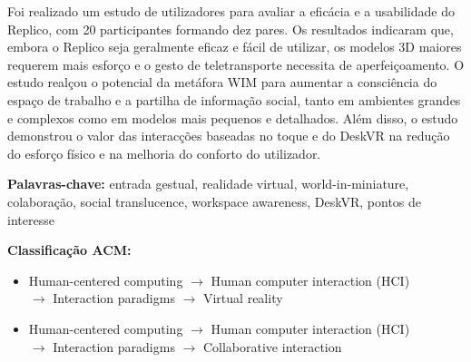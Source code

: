 Foi realizado um estudo de utilizadores para avaliar a eficácia e a usabilidade do Replico, com 20 participantes formando dez pares. Os resultados indicaram que, embora o Replico seja geralmente eficaz e fácil de utilizar, os modelos 3D maiores requerem mais esforço e o gesto de teletransporte necessita de aperfeiçoamento. O estudo realçou o potencial da metáfora WIM para aumentar a consciência do espaço de trabalho e a partilha de informação social, tanto em ambientes grandes e complexos como em modelos mais pequenos e detalhados. Além disso, o estudo demonstrou o valor das interacções baseadas no toque e do DeskVR na redução do esforço físico e na melhoria do conforto do utilizador.

\vspace{1em}

\noindent\textbf{Palavras-chave:} entrada gestual, realidade virtual, world-in-miniature, colaboração, social translucence, workspace awareness, DeskVR, pontos de interesse

\vspace{1em}

\noindent\textbf{Classificação ACM:}

\begin{itemize}
    \item Human-centered computing $\rightarrow$ Human computer interaction (HCI) \\ $\rightarrow$ Interaction paradigms $\rightarrow$ Virtual reality 
    \item Human-centered computing $\rightarrow$ Human computer interaction (HCI) \\ $\rightarrow$ Interaction paradigms $\rightarrow$ Collaborative interaction
\end{itemize}

